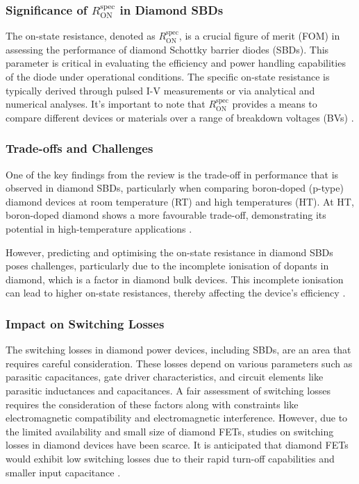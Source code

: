 \subsubsection{Significance of \( R_{\text{ON}}^{\text{spec}} \) in Diamond SBDs}
The on-state resistance, denoted as \( R_{\text{ON}}^{\text{spec}} \), is a crucial figure of merit (FOM) in assessing the performance of diamond Schottky barrier diodes (SBDs). This parameter is critical in evaluating the efficiency and power handling capabilities of the diode under operational conditions. The specific on-state resistance is typically derived through pulsed I-V measurements or via analytical and numerical analyses. It's important to note that \( R_{\text{ON}}^{\text{spec}} \) provides a means to compare different devices or materials over a range of breakdown voltages (BVs) \cite{donato2019}.

\subsubsection{Trade-offs and Challenges}
One of the key findings from the review is the trade-off in performance that is observed in diamond SBDs, particularly when comparing boron-doped (p-type) diamond devices at room temperature (RT) and high temperatures (HT). At HT, boron-doped diamond shows a more favourable trade-off, demonstrating its potential in high-temperature applications \cite{donato2019}.

However, predicting and optimising the on-state resistance in diamond SBDs poses challenges, particularly due to the incomplete ionisation of dopants in diamond, which is a factor in diamond bulk devices. This incomplete ionisation can lead to higher on-state resistances, thereby affecting the device's efficiency \cite{donato2019}.

\subsubsection{Impact on Switching Losses}
The switching losses in diamond power devices, including SBDs, are an area that requires careful consideration. These losses depend on various parameters such as parasitic capacitances, gate driver characteristics, and circuit elements like parasitic inductances and capacitances. A fair assessment of switching losses requires the consideration of these factors along with constraints like electromagnetic compatibility and electromagnetic interference. However, due to the limited availability and small size of diamond FETs, studies on switching losses in diamond devices have been scarce. It is anticipated that diamond FETs would exhibit low switching losses due to their rapid turn-off capabilities and smaller input capacitance \cite{donato2019}.

